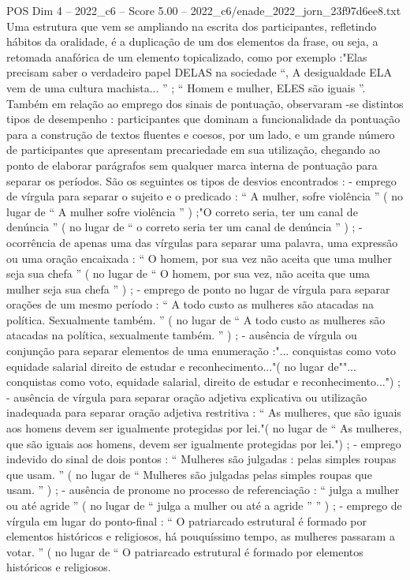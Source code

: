 \begin{textsample}{POS Dim 4 – 2022\_c6 – Score 5.00 – 2022\_c6/enade\_2022\_jorn\_23f97d6ee8.txt}
Uma estrutura que vem se ampliando na escrita dos participantes, refletindo hábitos da oralidade, é a duplicação de um dos elementos da frase, ou seja, a retomada anafórica de um elemento topicalizado, como por exemplo :"Elas precisam saber o verdadeiro papel DELAS na sociedade “, A desigualdade ELA vem de uma cultura machista... ” ; “ Homem e mulher, ELES são iguais ”.
Também em relação ao emprego dos sinais de pontuação, observaram -se distintos tipos de desempenho : participantes que dominam a funcionalidade da pontuação para a construção de textos fluentes e coesos, por um lado, e um grande número de participantes que apresentam precariedade em sua utilização, chegando ao ponto de elaborar parágrafos sem qualquer marca interna de pontuação para separar os períodos.
São os seguintes os tipos de desvios encontrados : - emprego de vírgula para separar o sujeito e o predicado : “ A mulher, sofre violência ” ( no lugar de “ A mulher sofre violência ” ) ;"O correto seria, ter um canal de denúncia ” ( no lugar de “ o correto seria ter um canal de denúncia ” ) ; - ocorrência de apenas uma das vírgulas para separar uma palavra, uma expressão ou uma oração encaixada : “ O homem, por sua vez não aceita que uma mulher seja sua chefa ” ( no lugar de “ O homem, por sua vez, não aceita que uma mulher seja sua chefa ” ) ; - emprego de ponto no lugar de vírgula para separar orações de um mesmo período : “ A todo custo as mulheres são atacadas na política.
Sexualmente também. ” ( no lugar de “ A todo custo as mulheres são atacadas na política, sexualmente também. ” ) ; - ausência de vírgula ou conjunção para separar elementos de uma enumeração :"... conquistas como voto equidade salarial direito de estudar e reconhecimento..."( no lugar de""... conquistas como voto, equidade salarial, direito de estudar e reconhecimento...") ; - ausência de vírgula para separar oração adjetiva explicativa ou utilização inadequada para separar oração adjetiva restritiva : “ As mulheres, que são iguais aos homens devem ser igualmente protegidas por lei."( no lugar de “ As mulheres, que são iguais aos homens, devem ser igualmente protegidas por lei.") ; - emprego indevido do sinal de dois pontos : “ Mulheres são julgadas : pelas simples roupas que usam. ” ( no lugar de “ Mulheres são julgadas pelas simples roupas que usam. ” ) ; - ausência de pronome no processo de referenciação : “ julga a mulher ou até agride ” ( no lugar de “ julga a mulher ou até a agride ” ” ) ; - emprego de vírgula em lugar do ponto-final : “ O patriarcado estrutural é formado por elementos históricos e religiosos, há pouquíssimo tempo, as mulheres passaram a votar. ” ( no lugar de “ O patriarcado estrutural é formado por elementos históricos e religiosos.

\end{textsample}
